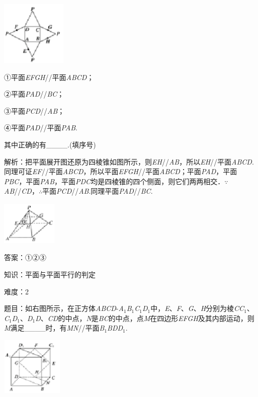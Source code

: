 \documentclass{article} %
\begin{document}
\includegraphics*[width=1.23in, height=1.22in, keepaspectratio=false]{image152}

①平面\textit{EFGH}//平面\textit{ABCD}；

②平面\textit{PAD}//\textit{BC}；

③平面\textit{PCD}//\textit{AB}；

④平面\textit{PAD}//平面\textit{PAB}.

其中正确的有\_\_\_\_.(填序号)

解析：把平面展开图还原为四棱锥如图所示，则\textit{EH}//\textit{AB}，所以\textit{EH}//平面\textit{ABCD}.同理可证\textit{EF}//平面\textit{ABCD}，所以平面\textit{EFGH}//平面\textit{ABCD}；平面\textit{PAD}，平面\textit{PBC}，平面\textit{PAB}，平面\textit{PDC}均是四棱锥的四个侧面，则它们两两相交．$\mathrm{\because}$\textit{AB}//\textit{CD}，$\mathrm{\therefore}$平面\textit{PCD}//\textit{AB}.同理平面\textit{PAD}//\textit{BC}.

\includegraphics*[width=1.04in, height=0.83in, keepaspectratio=false]{image153}

答案：①②③

知识：平面与平面平行的判定

难度：2

题目：如右图所示，在正方体\textit{ABCD}-\textit{A}${}_{1}$\textit{B}${}_{1}$\textit{C}${}_{1}$\textit{D}${}_{1}$中，\textit{E}、\textit{F}、\textit{G}、\textit{H}分别为棱\textit{CC}${}_{1}$、\textit{C}${}_{1}$\textit{D}${}_{1}$、\textit{D}${}_{1}$\textit{D}、\textit{CD}的中点，\textit{N}是\textit{BC}的中点，点\textit{M}在四边形\textit{EFGH}及其内部运动，则\textit{M}满足\_\_\_\_时，有\textit{MN}//平面\textit{B}${}_{1}$\textit{BDD}${}_{1}$.

\includegraphics*[width=1.17in, height=1.10in, keepaspectratio=false]{image154}
\end{document}
